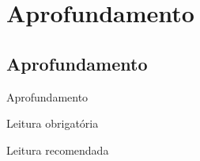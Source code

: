\documentclass{beamer}
\begin{document}
\section{Aprofundamento}

\subsection{Aprofundamento}

\begin{frame}{Aprofundamento}
  \begin{block}{Leitura obrigatória}
  \end{block}
  \begin{block}{Leitura recomendada}
  \end{block}
\end{frame}
\end{document}

